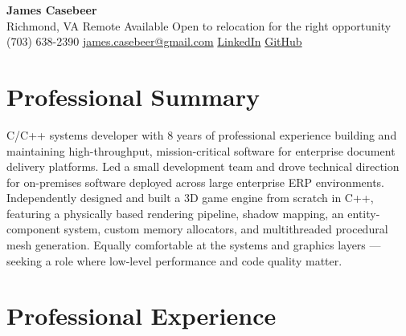 \documentclass[11pt, letterpaper]{article}
\begin{document}
\pagestyle{empty}

\begin{center}
  {\LARGE\bfseries James Casebeer}\\[4pt]
  Richmond, VA \quad\textbar\quad Remote Available \quad\textbar\quad Open to relocation for the right opportunity\\[3pt]
  (703) 638-2390 \quad\textbar\quad
  \href{mailto:james.casebeer@gmail.com}{james.casebeer@gmail.com} \quad\textbar\quad
  \href{https://www.linkedin.com/in/james-casebeer-b64b4813b/}{LinkedIn} \quad\textbar\quad
  \href{https://github.com/jcasebeer}{GitHub}
\end{center}

\section{Professional Summary}

C/C++ systems developer with 8 years of professional experience building and maintaining high-throughput, mission-critical software for enterprise document delivery platforms. Led a small development team and drove technical direction for on-premises software deployed across large enterprise ERP environments. Independently designed and built a 3D game engine from scratch in C++, featuring a physically based rendering pipeline, shadow mapping, an entity-component system, custom memory allocators, and multithreaded procedural mesh generation. Equally comfortable at the systems and graphics layers --- seeking a role where low-level performance and code quality matter.

\section{Professional Experience}
\end{document}
